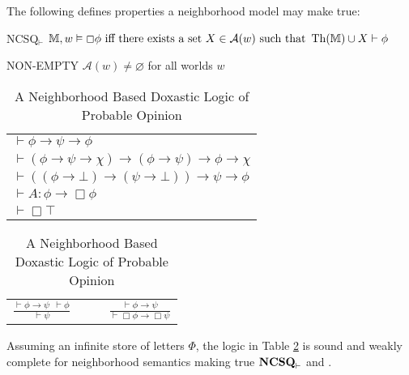 \begin{definition}
  The following defines properties a neighborhood model may make true:
  \begin{descriptiondash}
    \item[NCSQ$_\vdash$] $\mathbb{M}, w \vDash \Box \phi \text{ iff there exists a set
    $X \in \mathcal{A}(w)$ such that } \operatorname{Th} (\mathbb{M}) \cup X \vdash
    \phi$
    \item[NON-EMPTY] $\mathcal{A}(w)
      \neq \varnothing$ for all worlds $w$
  \end{descriptiondash}
\end{definition}

\begin{table}[h]
\begin{centering}
  \begin{tabular}{l}
    $\vdash \phi \rightarrow \psi \rightarrow \phi$\\
    $\vdash (\phi \rightarrow \psi \rightarrow \chi) \rightarrow (\phi
    \rightarrow \psi) \rightarrow \phi \rightarrow \chi$\\
    $\vdash ((\phi \rightarrow \bot) \rightarrow (\psi \rightarrow \bot))
    \rightarrow \psi \rightarrow \phi$\\
    $\vdash A : \phi \rightarrow \Box \phi$\\
    $\vdash \Box \top$
  \end{tabular}

    \begin{tabular}{lll}
      $\displaystyle\frac{\vdash \phi \rightarrow \psi \ \ \vdash \phi}{\vdash
      \psi}$ & \ \ & $\displaystyle\frac{\vdash \phi \rightarrow \psi}{\vdash \Box \phi
      \rightarrow \Box \psi}$
    \end{tabular}
  \caption{\label{logic3}A Neighborhood Based Doxastic Logic of
    Probable Opinion}
\end{centering}
\end{table}

\begin{theorem}
  Assuming an infinite store of letters $\Phi$, the logic in Table
  \ref{logic3} is sound and weakly complete for neighborhood semantics making
  true $\textup{{\bfseries{NCSQ}}}_\vdash$ and .
\end{theorem}

